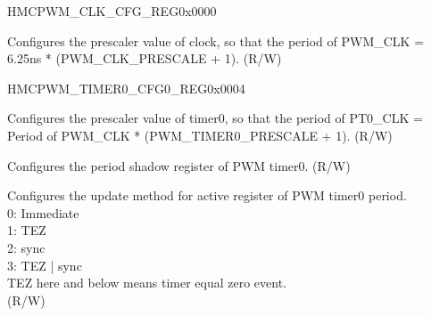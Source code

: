 \begin{register}{H}{MCPWM\_CLK\_CFG\_REG}{0x0000}\label{regdesc:MCPWMCLKCFGREG}
%
%
\regnewline%
\begin{regdesc}\begin{reglist}
\label{fielddesc:MCPWMCLKPRESCALE}\item [MCPWM\_CLK\_PRESCALE] Configures the prescaler value of clock, so that the period of PWM\_CLK = 6.25ns * (PWM\_CLK\_PRESCALE + 1). (R/W)
\end{reglist}\end{regdesc}
\end{register}


\begin{register}{H}{MCPWM\_TIMER0\_CFG0\_REG}{0x0004}\label{regdesc:MCPWMTIMER0CFG0REG}
%
%
%
%
\regnewline%
\begin{regdesc}\begin{reglist}
\label{fielddesc:MCPWMTIMER0PRESCALE}\item [MCPWM\_TIMER0\_PRESCALE] Configures the prescaler value of timer0, so that the period of PT0\_CLK = Period of PWM\_CLK * (PWM\_TIMER0\_PRESCALE + 1). (R/W)
\label{fielddesc:MCPWMTIMER0PERIOD}\item [MCPWM\_TIMER0\_PERIOD] Configures the period shadow register of PWM timer0. (R/W)
\label{fielddesc:MCPWMTIMER0PERIODUPMETHOD}\item [MCPWM\_TIMER0\_PERIOD\_UPMETHOD] Configures the update method for active register of PWM timer0 period.\\
0: Immediate\\
1: TEZ\\
2: sync\\
3: TEZ | sync\\
TEZ here and below means timer equal zero event.\\
 (R/W)
\end{reglist}\end{regdesc}
\end{register}


